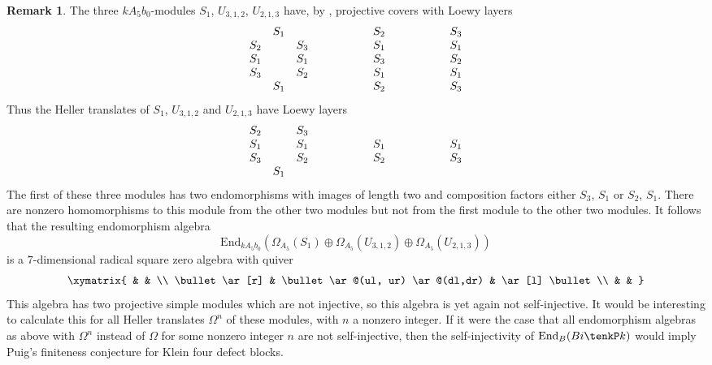 \documentclass{amsart}
\theoremstyle{plain}\newtheorem{Theorem}{Theorem}[section]
\theoremstyle{plain}\newtheorem{Conjecture}[Theorem]{Conjecture}
\theoremstyle{plain}\newtheorem{Corollary}[Theorem]{Corollary}
\theoremstyle{plain}\newtheorem{Lemma}[Theorem]{Lemma}
\theoremstyle{plain}\newtheorem{Proposition}[Theorem]{Proposition}
\theoremstyle{definition}\newtheorem{Definition}[Theorem]{Definition}
\theoremstyle{definition}\newtheorem{Example}[Theorem]{Example}
\theoremstyle{definition}\newtheorem{Examples}[Theorem]{Examples}
\theoremstyle{definition}\newtheorem{Exercise}[Theorem]{Exercise}
\theoremstyle{definition}\newtheorem{Notation}[Theorem]{Notation}
\theoremstyle{definition}\newtheorem{Remark}[Theorem]{Remark}
\theoremstyle{definition}\newtheorem{Remarks}[Theorem]{Remarks}
\theoremstyle{plain}\newtheorem{Statement}[Theorem]{}
\def\End{\mathrm{End}}
\begin{document}
\begin{Remark}
 The three $kA_5b_0$-modules $S_1$, $U_{3,1,2}$, $U_{2,1,3}$
 have, by \cite[Theorem 4]{Erdmann82},  projective covers with Loewy layers
 $$
 \begin{matrix} & S_1 & \\ S_2 & & S_3 \\ S_1 & & S_1 \\ S_3 & &  S_2 \\ & S_1 
 \end{matrix} \hskip2cm
 \begin{matrix} S_2 \\ S_1 \\ S_3 \\ S_1 \\ S_2 \end{matrix} \hskip2cm
 \begin{matrix} S_3 \\ S_1 \\ S_2 \\ S_1 \\ S_3 \end{matrix}
 $$
 Thus the Heller translates of $S_1$, $U_{3,1,2}$ and $U_{2,1,3}$ have
 Loewy layers
 $$
 \begin{matrix} S_2 & & S_3 \\ S_1 & & S_1 \\ S_3 & &  S_2 \\ & S_1 
 \end{matrix} \hskip2cm
 \begin{matrix} S_1 \\ S_2  \end{matrix} \hskip2cm
 \begin{matrix} S_1 \\ S_3  \end{matrix}
 $$
 The first of these three modules has two endomorphisms with images
 of length two and composition factors either $S_3$, $S_1$ or $S_2$, $S_1$.
 There are nonzero homomorphisms to this module from the other two modules
 but not from the first module to the other two modules. 
 It follows that the resulting endomorphism algebra
 $$\End_{kA_5b_0}(\Omega_{A_5}(S_1) \oplus \Omega_{A_5}(U_{3,1,2})
 \oplus \Omega_{A_5}(U_{2,1,3}))$$
 is a $7$-dimensional radical square zero algebra with quiver
 $$\xymatrix{ & & \\ 
 \bullet \ar[r] & \bullet \ar@(ul, ur) \ar@(dl,dr) & \ar[l] \bullet \\
 & & }$$
This algebra has two projective simple modules which are not injective, so this
algebra is yet again not self-injective. It would be interesting to calculate this for all
Heller translates $\Omega^n$ of these modules, with $n$ a nonzero integer.
If it were the case that all endomorphism algebras as above with $\Omega^n$
instead of $\Omega$ for some nonzero integer $n$ are not self-injective, then the 
self-injectivity of $\End_B(Bi\tenkP k)$ would imply  Puig's finiteness conjecture 
for Klein four defect blocks.
\end{Remark}
\end{document}
